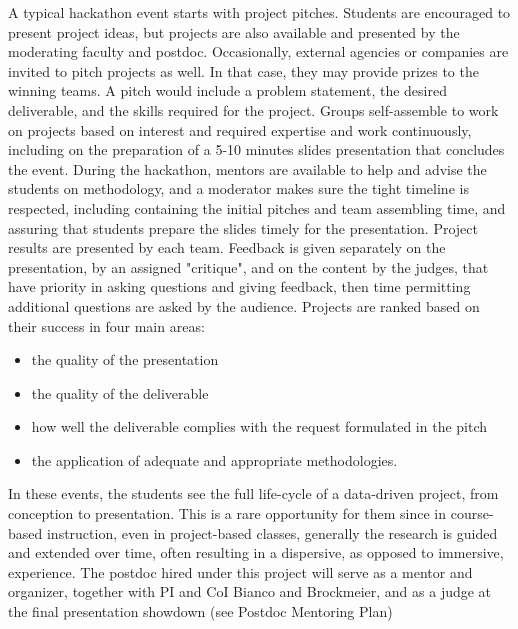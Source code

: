 A typical hackathon event starts with project pitches.  Students are encouraged to present project ideas, but projects are also available and presented by the moderating faculty and postdoc.  Occasionally, external agencies or companies are invited to pitch projects as well.  In that case, they may provide prizes to the winning teams.  A pitch would include a problem statement, the desired deliverable, and the skills required for the project.
Groups self-assemble to work on projects based on interest and required expertise and work continuously, including on the preparation of a 5-10 minutes slides presentation that concludes the event.  During the hackathon, mentors are available to help and advise the students on methodology, and a moderator makes sure the tight timeline is respected, including containing the initial pitches and team assembling time, and assuring that students prepare the slides timely for the presentation. 
Project results are presented by each team.  Feedback is given separately on the presentation, by an assigned "critique", and on the content by the judges, that have priority in asking questions and giving feedback, then time permitting additional questions are asked by the audience.  Projects are ranked based on their success in four main areas: 
\begin{itemize}
\item the quality of the presentation
\item the quality of the deliverable
\item how well the deliverable complies with the request formulated in the pitch 
\item the application of adequate and appropriate methodologies.
\end{itemize}

In these events, the students see the full life-cycle of a data-driven project, from conception to presentation.  This is a rare opportunity for them since in course-based instruction, even in project-based classes, generally the research is guided and extended over time, often resulting in a dispersive, as opposed to immersive, experience. The postdoc hired under this project will serve as a mentor and organizer, together with PI and CoI Bianco and Brockmeier, and as a judge at the final presentation showdown (see Postdoc Mentoring Plan)
